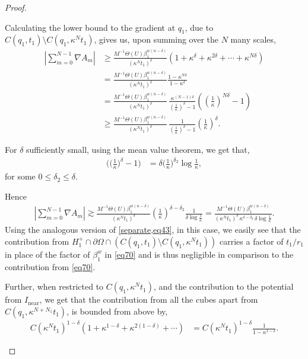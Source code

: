 \documentclass{article}
\theoremstyle{plain}
\theoremstyle{plain}
\newcommand{\thee}{\Theta(U)}
\theoremstyle{definition}
\theoremstyle{plain}
\begin{document}
\begin{proof}
\begin{itemize}
Calculating the lower bound to the gradient at \(q_1\),
due to \( C(q_1,t_1) \setminus C(q_1,\kappa^N t_1) \), gives us, upon summing
over the \(N\) many scales,
\begin{align}
|\sum_{m=0}^{N-1} \nabla A_m|
&\ge
\frac{M^{-1}\thee\beta_1^{w (n-\delta)}}{(\kappa^N t_1)^{\delta}}
\left( 1 + \kappa^{\delta} + \kappa^{2\delta} + \cdots + \kappa^{N\delta} \right)
\\
&=
\frac{M^{-1}\thee\beta_1^{w (n-\delta)}}{(\kappa^N t_1)^{\delta}}
\frac{1-\kappa^{N\delta}}{1-\kappa^{\delta}}
\\
&=
\frac{M^{-1}\thee\beta_1^{w (n-\delta)}}{(\kappa^N t_1)^{\delta}}
\,
\frac{\kappa^{(N-1)\delta}}{\left( \frac{1}{\kappa} \right)^{\delta}-1}
\left( \left(\frac{1}{\kappa}\right)^{N\delta} - 1 \right)
\\
&\ge
\frac{M^{-1}\thee\beta_1^{w (n-\delta)}}{(\kappa^N t_1)^{\delta}}
\,
\frac{1}{\left( \frac{1}{\kappa} \right)^{\delta}-1}
\left( \frac{1}{\kappa} \right)^{\delta}.
\end{align}

For \(\delta\) sufficiently small, using the mean value theorem, we get that,
\begin{align}\label{mvt}
\Bigg(\Big( \frac{1}{\kappa} \Big)^{\delta}-1\Bigg)
&= \delta \Big(\frac{1}{\kappa}\Big)^{\delta_2} \log \frac{1}{\kappa},
\end{align}
for some $0\leq \delta_2\leq \delta$.

Hence
\begin{align}
|\sum_{m=0}^{N-1} \nabla A_m|
\gtrsim
\frac{M^{-1}\thee\beta_1^{w (n-\delta)}}{(\kappa^N t_1)^{\delta}}
\left( \frac{1}{\kappa} \right)^{\delta-\delta_2}
\frac{1}{\delta \log \frac{1}{\kappa}}
=
\frac{M^{-1}\thee\beta_1^{w (n-\delta)}}{(\kappa^N t_1)^{\delta}\,
\kappa^{\delta-\delta_2}\,\delta \log \frac{1}{\kappa}} .
\end{align}
Using the analogous version of \cref{separate,eq43}, in this case, we easily see that the contribution from $H^{+}_1\cap \partial\Omega \cap (C(q_1,t_1)\setminus C(q_1,\kappa^N t_1))$ carries a factor of $t_1/r_1$ in place of the factor of $\beta_{1}^w$ in \cref{eq70} and is thus negligible in comparison to the contribution from \cref{eq70}.

Further, when restricted to \(C(q_1,\kappa^N t_1)\), and the contribution to the potential from $I_{\text{near}}$, we get that the contribution from all
the cubes apart from \(C(q_1,\kappa^{N+N_1} t_1)\), is bounded from above by,
\begin{align}
C (\kappa^N t_1)^{1-\delta}
\left( 1 + \kappa^{1-\delta} + \kappa^{2(1-\delta)} + \cdots \right)
&=
C (\kappa^N t_1)^{1-\delta}
\frac{1}{1-\kappa^{1-\delta}} .
\end{align}


\end{itemize}
\end{proof}
\end{document}
